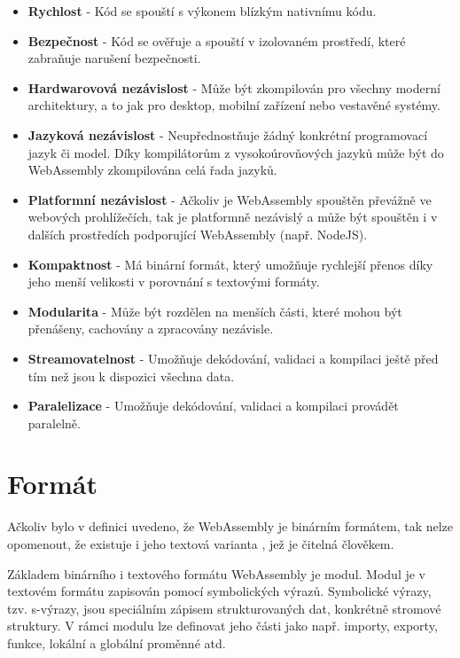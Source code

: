 \documentclass{{template/ctuthesis}}
\begin{document}
\begin{itemize}
  \item \textbf{Rychlost} - Kód se spouští s výkonem blízkým nativnímu kódu.
  \item \textbf{Bezpečnost} - Kód se ověřuje a spouští v izolovaném prostředí, které zabraňuje narušení bezpečnosti.
  \item \textbf{Hardwarovová nezávislost} - Může být zkompilován pro všechny moderní architektury, a to jak pro desktop, mobilní zařízení nebo vestavěné systémy.
  \item \textbf{Jazyková nezávislost} - Neupřednostňuje žádný konkrétní programovací jazyk či model. Díky kompilátorům z vysokoúrovňových jazyků může být do WebAssembly zkompilována celá řada jazyků.
  \item \textbf{Platformní nezávislost} - Ačkoliv je WebAssembly spouštěn převážně ve webových prohlížečích, tak je platformně nezávislý a může být spouštěn i v dalších prostředích podporující WebAssembly (např. NodeJS).
  \item \textbf{Kompaktnost} - Má binární formát, který umožňuje rychlejší přenos díky jeho menší velikosti v porovnání s textovými formáty.
  \item \textbf{Modularita} - Může být rozdělen na menších části, které mohou být přenášeny, cachovány a zpracovány nezávisle.
  \item \textbf{Streamovatelnost} - Umožňuje dekódování, validaci a kompilaci ještě před tím než jsou k dispozici všechna data.
  \item \textbf{Paralelizace} - Umožňuje dekódování, validaci a kompilaci provádět paralelně.
\end{itemize}


\section{Formát}

Ačkoliv bylo v definici uvedeno, že WebAssembly je binárním formátem, tak nelze opomenout, že existuje i jeho textová varianta \cite{wasm-wat}, jež je čitelná člověkem.

Základem binárního i textového formátu WebAssembly je modul. Modul je v textovém formátu zapisován pomocí symbolických výrazů. Symbolické výrazy\cite{sexpr}, tzv. s-výrazy, jsou speciálním zápisem strukturovaných dat, konkrétně stromové struktury. V rámci modulu lze definovat jeho části jako např. importy, exporty, funkce, lokální a globální proměnné atd.
\end{document}
